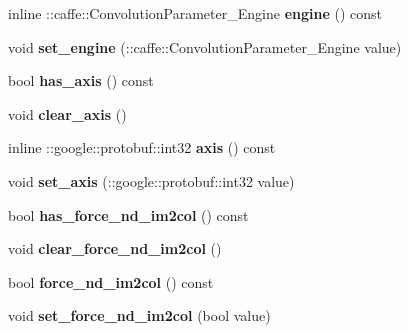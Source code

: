 \begin{DoxyCompactItemize}
inline \+::caffe\+::\+Convolution\+Parameter\+\_\+\+Engine {\bfseries engine} () const
\item 
\mbox{\label{classcaffe_1_1_convolution_parameter_a833de60a3c86589b07584c1db34b7c03}} 
void {\bfseries set\+\_\+engine} (\+::caffe\+::\+Convolution\+Parameter\+\_\+\+Engine value)
\item 
\mbox{\label{classcaffe_1_1_convolution_parameter_ab803fcecd6ba366a5e9dfabb53e15aee}} 
bool {\bfseries has\+\_\+axis} () const
\item 
\mbox{\label{classcaffe_1_1_convolution_parameter_a35fde4c5188e27cdd71cd74a29bc3ac9}} 
void {\bfseries clear\+\_\+axis} ()
\item 
\mbox{\label{classcaffe_1_1_convolution_parameter_a8f259bcef7bd131e11f0fb41c37bd419}} 
inline \+::google\+::protobuf\+::int32 {\bfseries axis} () const
\item 
\mbox{\label{classcaffe_1_1_convolution_parameter_a677325a5e895f1edf377934d564fd0d9}} 
void {\bfseries set\+\_\+axis} (\+::google\+::protobuf\+::int32 value)
\item 
\mbox{\label{classcaffe_1_1_convolution_parameter_a341dd6f79be534f816ce327f0b74a888}} 
bool {\bfseries has\+\_\+force\+\_\+nd\+\_\+im2col} () const
\item 
\mbox{\label{classcaffe_1_1_convolution_parameter_afa2ec6603e439b82b3076051612c74cc}} 
void {\bfseries clear\+\_\+force\+\_\+nd\+\_\+im2col} ()
\item 
\mbox{\label{classcaffe_1_1_convolution_parameter_a63857e80cb4c4bae81e15dd5b84fe649}} 
bool {\bfseries force\+\_\+nd\+\_\+im2col} () const
\item 
\mbox{\label{classcaffe_1_1_convolution_parameter_ae5e900fbb2edee371d0c211802f7b0bd}} 
void {\bfseries set\+\_\+force\+\_\+nd\+\_\+im2col} (bool value)
\item 

\end{DoxyCompactItemize}
